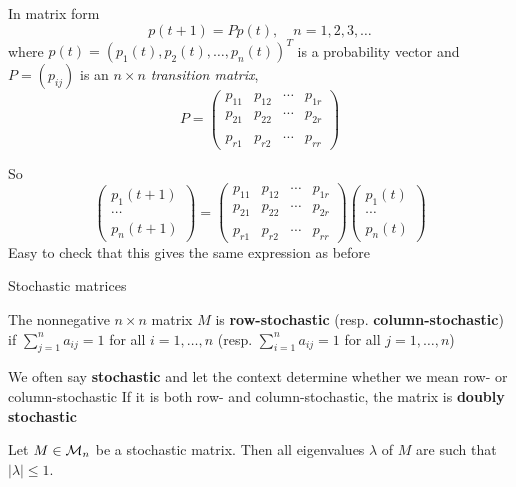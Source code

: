\documentclass[aspectratio=169]{beamer}\usepackage[]{graphicx}\usepackage[]{xcolor}
\begin{document}
\begin{frame}
In matrix form
\[
p(t+1)=Pp(t), \quad n=1,2,3,\dots
\]
where $p(t)=(p_1(t),p_{2}(t),\dots , p_n(t))^T$ is a probability vector and $P=(p_{ij})$ is an $n\times n$ \emph{transition matrix},
\[
P=
\begin{pmatrix}
p_{11} & p_{12} & \cdots & p_{1r} \\
p_{21} & p_{22} & \cdots & p_{2r} \\
&&& \\
p_{r1} & p_{r2} & \cdots & p_{rr}
\end{pmatrix}
\]
\end{frame}


\begin{frame}
So
\[
\begin{pmatrix}
	p_1(t+1) \\ \cdots \\ p_n(t+1)
\end{pmatrix}
=
\begin{pmatrix}
p_{11} & p_{12} & \cdots & p_{1r} \\
p_{21} & p_{22} & \cdots & p_{2r} \\
&&& \\
p_{r1} & p_{r2} & \cdots & p_{rr}
\end{pmatrix}
\begin{pmatrix}
	p_1(t) \\ \cdots \\ p_n(t)
\end{pmatrix}
\]
\vfill
Easy to check that this gives the same expression as before
\end{frame}



\begin{frame}{Stochastic matrices}
\begin{definition}
The nonnegative $n\times n$ matrix $M$ is \textbf{row-stochastic} (resp. \textbf{column-stochastic}) if $\sum_{j=1}^na_{ij}=1$ for all $i=1,\dots,n$ (resp. $\sum_{i=1}^na_{ij}=1$ for all $j=1,\dots,n$)
\end{definition}
\vfill
We often say \textbf{stochastic} and let the context determine whether we mean row- or column-stochastic
\vfill
If it is both row- and column-stochastic, the matrix is \textbf{doubly stochastic}
\vfill
\begin{theorem}\label{th:spectrum_stochastic_matrix}
Let $M\in\mathcal{M}_n$ be a stochastic matrix. Then all eigenvalues $\lambda$ of $M$ are such that $|\lambda|\leq 1$.
\end{theorem}
\end{frame}
\end{document}
